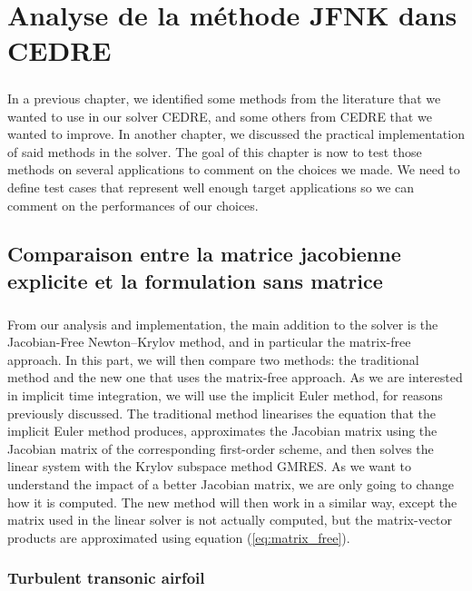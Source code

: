 \chapter{Analyse de la méthode JFNK dans CEDRE}

  \paragraph{}
  In a previous chapter, we identified some methods from the literature that we wanted to use in our solver CEDRE, and some others from CEDRE that we wanted to improve.
  In another chapter, we discussed the practical implementation of said methods in the solver.
  The goal of this chapter is now to test those methods on several applications to comment on the choices we made.
  We need to define test cases that represent well enough target applications so we can comment on the performances of our choices.


  \section{Comparaison entre la matrice jacobienne explicite et la formulation sans matrice}

    \paragraph{}
    From our analysis and implementation, the main addition to the solver is the Jacobian-Free Newton--Krylov method, and in particular the matrix-free approach.
    In this part, we will then compare two methods: the traditional method and the new one that uses the matrix-free approach.
    As we are interested in implicit time integration, we will use the implicit Euler method, for reasons previously discussed.
    The traditional method linearises the equation that the implicit Euler method produces, approximates the Jacobian matrix using the Jacobian matrix of the corresponding first-order scheme, and then solves the linear system with the Krylov subspace method GMRES.
    As we want to understand the impact of a better Jacobian matrix, we are only going to change how it is computed.
    The new method will then work in a similar way, except the matrix used in the linear solver is not actually computed, but the matrix-vector products are approximated using equation (\ref{eq:matrix_free}).


    \subsection{Turbulent transonic airfoil}

